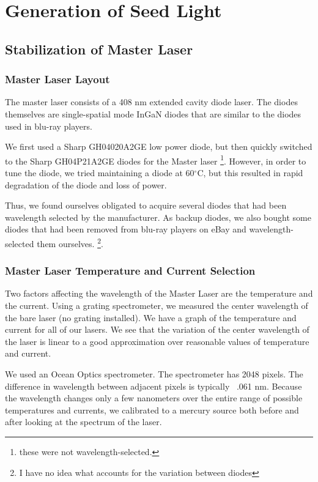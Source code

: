 \chapter{Generation of Seed Light}\label{generationOfSeedLight}

\section{Stabilization of Master Laser}
\subsection{Master Laser Layout}
The master laser consists of a 408 nm extended cavity diode laser. The diodes themselves are single-spatial mode InGaN diodes that are similar to the diodes used in blu-ray players.

We first used a Sharp GH04020A2GE low power diode, but then quickly switched to the Sharp GH04P21A2GE diodes for the Master laser \footnote{these were not wavelength-selected.}. However, in order to tune the diode, we tried maintaining a diode at 60$^\circ$C, but this resulted in rapid degradation of the diode and loss of power. 

Thus, we found ourselves obligated to acquire several diodes that had been wavelength selected by the manufacturer. As backup diodes, we also bought some diodes that had been removed from blu-ray players on eBay and wavelength-selected them ourselves. \footnote{I have no idea what accounts for the variation between diodes}. 

\subsection{Master Laser Temperature and Current Selection}

Two factors affecting the wavelength of the Master Laser are the temperature and the current. Using a grating spectrometer, we measured the center wavelength of the bare laser (no grating installed). We have a graph of the temperature and current for all of our lasers. We see that the variation of the center wavelength of the laser is linear to a good approximation over reasonable values of temperature and current.

We used an Ocean Optics spectrometer. The spectrometer has 2048 pixels. The difference in wavelength between adjacent pixels is typically ~.061 nm. %
Because the wavelength changes only a few nanometers over the entire range of possible temperatures and currents, we calibrated to a mercury source both before and after looking at the spectrum of the laser. 

